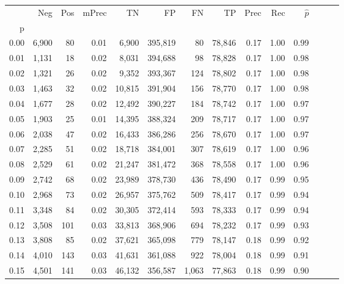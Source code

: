 \begin{tabular}{rrrrrrrrrrrrrr}
\toprule
{} &    Neg &    Pos & mPrec &       TN &       FP &      FN &      TP &  Prec &   Rec & $\hat{p}$ \\
p    &        &        &       &          &          &         &         &       &       &           \\
\midrule
0.00 &  6,900 &     80 &  0.01 &    6,900 &  395,819 &      80 &  78,846 &  0.17 &  1.00 &      0.99 \\
0.01 &  1,131 &     18 &  0.02 &    8,031 &  394,688 &      98 &  78,828 &  0.17 &  1.00 &      0.98 \\
0.02 &  1,321 &     26 &  0.02 &    9,352 &  393,367 &     124 &  78,802 &  0.17 &  1.00 &      0.98 \\
0.03 &  1,463 &     32 &  0.02 &   10,815 &  391,904 &     156 &  78,770 &  0.17 &  1.00 &      0.98 \\
0.04 &  1,677 &     28 &  0.02 &   12,492 &  390,227 &     184 &  78,742 &  0.17 &  1.00 &      0.97 \\
0.05 &  1,903 &     25 &  0.01 &   14,395 &  388,324 &     209 &  78,717 &  0.17 &  1.00 &      0.97 \\
0.06 &  2,038 &     47 &  0.02 &   16,433 &  386,286 &     256 &  78,670 &  0.17 &  1.00 &      0.97 \\
0.07 &  2,285 &     51 &  0.02 &   18,718 &  384,001 &     307 &  78,619 &  0.17 &  1.00 &      0.96 \\
0.08 &  2,529 &     61 &  0.02 &   21,247 &  381,472 &     368 &  78,558 &  0.17 &  1.00 &      0.96 \\
0.09 &  2,742 &     68 &  0.02 &   23,989 &  378,730 &     436 &  78,490 &  0.17 &  0.99 &      0.95 \\
0.10 &  2,968 &     73 &  0.02 &   26,957 &  375,762 &     509 &  78,417 &  0.17 &  0.99 &      0.94 \\
0.11 &  3,348 &     84 &  0.02 &   30,305 &  372,414 &     593 &  78,333 &  0.17 &  0.99 &      0.94 \\
0.12 &  3,508 &    101 &  0.03 &   33,813 &  368,906 &     694 &  78,232 &  0.17 &  0.99 &      0.93 \\
0.13 &  3,808 &     85 &  0.02 &   37,621 &  365,098 &     779 &  78,147 &  0.18 &  0.99 &      0.92 \\
0.14 &  4,010 &    143 &  0.03 &   41,631 &  361,088 &     922 &  78,004 &  0.18 &  0.99 &      0.91 \\
0.15 &  4,501 &    141 &  0.03 &   46,132 &  356,587 &   1,063 &  77,863 &  0.18 &  0.99 &      0.90 \\

\end{tabular}
